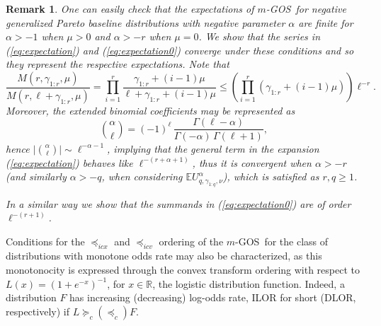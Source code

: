 \documentclass [11pt]{article}
\newtheorem{remark}{Remark}
\newcommand{\gos}{GOS}
\begin{document}
\begin{remark}
One can easily check that the expectations of 
$m$-\gos\ for negative generalized Pareto baseline distributions with 
negative parameter $\alpha$ are finite for $\alpha >-1$ when $\mu>0$
and $\alpha >-r$ when $\mu=0$. 
We show that the series in (\ref{eq:expectation}) and (\ref{eq:expectation0}) converge under these conditions and so they
represent the respective expectations.
Note that
$$
\frac{M(r,\gamma_{1:r},\mu)}{M(r,\ell+\gamma_{1:r},\mu)}
=\prod_{i=1}^r \frac{\gamma_{1:r}+(i-1)\mu}{\ell+\gamma_{1:r}+(i-1)\mu}\leq	\left(\prod_{i=1}^r(\gamma_{1:r}+(i-1)\mu)\right)\ell^{-r}.
$$
Moreover, the extended binomial coefficients may be represented as
$$
\binom{\alpha}{\ell}=(-1)^\ell\,\frac{\Gamma(\ell-\alpha)}{\Gamma(-\alpha)\,\Gamma(\ell+1)},
$$
hence $\bigl|\binom{\alpha}{\ell}\bigr|\sim\ell^{-\alpha-1}$, implying that the general term in the expansion (\ref{eq:expectation}) behaves like $\ell^{-(r+\alpha+1)}$, thus it is convergent when $\alpha>-r$ (and similarly $\alpha>-q$, when considering $\mathbb E U_{q,\gamma_{1:q},\nu}^{\alpha}$), which is satisfied as $r,q\geq 1$.

In a similar way we show that the summands in (\ref{eq:expectation0}) are of order $\ell^{-(r+1)}$.
\end{remark}

Conditions for the $\preceq_{icx}$ and $\preceq_{icv}$ ordering of the $m$-\gos\ for the class of distributions with monotone odds rate may also be characterized, as this monotonocity is expressed through the convex transform ordering with respect to $L(x)=(1+e^{-x})^{-1}$, for $x\in\mathbb{R}$, the logistic distribution function. Indeed, a distribution $F$ has increasing (decreasing) log-odds rate, ILOR for short (DLOR, respectively) if $L\succeq_c (\preceq_c)F$. 
\end{document}
